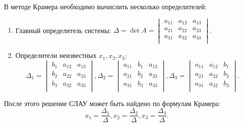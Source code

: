 \documentclass[10pt]{article}
\numberwithin{primer}{section}
\numberwithin{equation}{section}
\begin{document}
В методе Крамера необходимо вычислить несколько определителей:
\begin{enumerate}
  \item Главный определитель системы:
$\Delta=\det A=\begin{vmatrix}
  a_{11} & a_{12} & a_{13}\\
  a_{21} & a_{22} & a_{23}\\
  a_{31} & a_{32} & a_{33}\\
\end{vmatrix}.$
  \item Определители неизвестных $x_1,x_2,x_3$:
 \begin{equation*}\Delta_1=\begin{vmatrix}
  b_1 & a_{12} & a_{13}\\
  b_2 & a_{22} & a_{23}\\
  b_3 & a_{32} & a_{33}\\
\end{vmatrix}, \Delta_2=\begin{vmatrix}
  a_{11} & b_1 & a_{13}\\
  a_{21} & b_2 & a_{23}\\
  a_{31} & b_3 & a_{33}\\
\end{vmatrix}, \Delta_3=\begin{vmatrix}
  a_{11} & a_{12} & b_1\\
  a_{21} & a_{22} & b_2\\
  a_{31} & a_{32} & b_3\\
\end{vmatrix}.\end{equation*}
\end{enumerate}
После этого решение СЛАУ может быть найдено по формулам Крамера:
\begin{equation}\label{eq:kramer}
x_1=\frac{\Delta_1}{\Delta},x_2=\frac{\Delta_2}{\Delta},x_3=\frac{\Delta_3}{\Delta}.
\end{equation}
\end{document}
